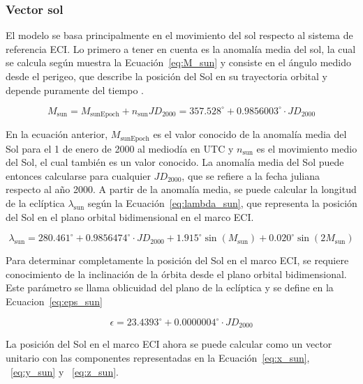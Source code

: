 \subsubsection{Vector sol}

El modelo se basa principalmente en el movimiento del sol respecto al sistema de referencia ECI. Lo primero a tener en cuenta es la anomalía media del sol, la cual se calcula según muestra la Ecuación~\ref{eq:M_sun} y consiste en el ángulo medido desde el perigeo, que describe la posición del Sol en su trayectoria orbital y depende puramente del tiempo \cite{ref15}.

\begin{equation}
	M_{\text{sun}} = M_{\text{sunEpoch}} + n_{\text{sun}}JD_{2000} = 357.528^\circ +   0.9856003^\circ \cdot JD_{2000}
	\label{eq:M_sun}
\end{equation}

En la ecuación anterior, $M_{\text{sunEpoch}}$ es el valor conocido de la anomalía media del Sol para el 1 de enero de 2000 al mediodía en UTC y $n_{\text{sun}}$ es el movimiento medio del Sol, el cual también es un valor conocido. La anomalía media del Sol puede entonces calcularse para cualquier $JD_{2000}$, que se refiere a la fecha juliana respecto al año 2000. A partir de la anomalía media, se puede calcular la longitud de la eclíptica $\lambda_{\text{sun}}$ según la Ecuación~\ref{eq:lambda_sun}, que representa la posición del Sol en el plano orbital bidimensional en el marco ECI.

\begin{equation}
	\lambda_{\text{sun}} = 280.461^\circ + 0.9856474^\circ \cdot JD_{2000} + 1.915^\circ \sin(M_{\text{sun}}) + 0.020^\circ \sin(2 M_{\text{sun}})
	\label{eq:lambda_sun}
\end{equation}

Para determinar completamente la posición del Sol en el marco ECI, se requiere conocimiento de la inclinación de la órbita desde el plano orbital bidimensional. Este parámetro se llama oblicuidad del plano de la eclíptica y se define en la Ecuacion~\ref{eq:eps_sun}

\begin{equation}
	\epsilon = 23.4393^\circ + 0.0000004^\circ \cdot JD_{2000}
	\label{eq:eps_sun}
\end{equation}

La posición del Sol en el marco ECI ahora se puede calcular como un vector unitario con las componentes representadas en la Ecuación~\ref{eq:x_sun}, ~\ref{eq:y_sun} y ~\ref{eq:z_sun}.

